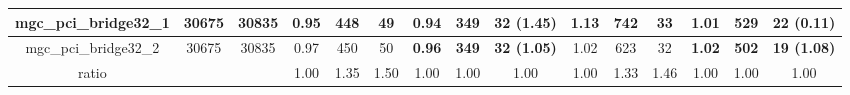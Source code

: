 \begin{table*}[]
{\begin{tabular}{|c||c|c|ccc|ccc||ccc|ccc|}
mgc\_pci\_bridge32\_1      & 30675                    & 30835                  & \multicolumn{1}{c|}{0.95}          & \multicolumn{1}{c|}{448}       & 49      & \multicolumn{1}{c|}{\textbf{0.94}}  & \multicolumn{1}{c|}{\textbf{349}} & \textbf{32 (1.45)} & \multicolumn{1}{c|}{1.13}           & \multicolumn{1}{c|}{742}       & 33      & \multicolumn{1}{c|}{\textbf{1.01}}  & \multicolumn{1}{c|}{\textbf{529}} & \textbf{22 (0.11)} \\ \hline
mgc\_pci\_bridge32\_2      & 30675                    & 30835                  & \multicolumn{1}{c|}{0.97}          & \multicolumn{1}{c|}{450}       & 50      & \multicolumn{1}{c|}{\textbf{0.96}}  & \multicolumn{1}{c|}{\textbf{349}} & \textbf{32 (1.05)} & \multicolumn{1}{c|}{1.02}           & \multicolumn{1}{c|}{623}       & 32      & \multicolumn{1}{c|}{\textbf{1.02}}  & \multicolumn{1}{c|}{\textbf{502}} & \textbf{19 (1.08)} \\ \hline
ratio                      &                          &                        & \multicolumn{1}{c|}{1.00}          & \multicolumn{1}{c|}{1.35}      & 1.50    & \multicolumn{1}{c|}{1.00}           & \multicolumn{1}{c|}{1.00}         & 1.00               & \multicolumn{1}{c|}{1.00}           & \multicolumn{1}{c|}{1.33}      & 1.46    & \multicolumn{1}{c|}{1.00}           & \multicolumn{1}{c|}{1.00}         & 1.00               \\ \hline

\end{tabular}}
\end{table*}


